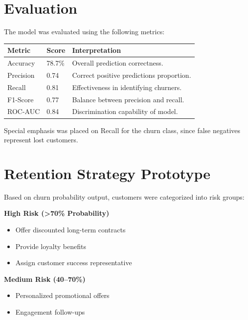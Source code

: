 \documentclass[12pt,a4paper]{article}
\begin{document}

\section{Evaluation}

The model was evaluated using the following metrics:

\begin{center}
\begin{tabular}{@{}lll@{}}
\toprule
\textbf{Metric} & \textbf{Score} & \textbf{Interpretation} \\
\midrule
Accuracy & 78.7\% & Overall prediction correctness. \\
Precision & 0.74 & Correct positive predictions proportion. \\
Recall & 0.81 & Effectiveness in identifying churners. \\
F1-Score & 0.77 & Balance between precision and recall. \\
ROC-AUC & 0.84 & Discrimination capability of model. \\
\bottomrule
\end{tabular}
\end{center}

Special emphasis was placed on Recall for the churn class, since false negatives represent lost customers.


\section{Retention Strategy Prototype}

Based on churn probability output, customers were categorized into risk groups:

\textbf{High Risk (>70\% Probability)}
\begin{itemize}
    \item Offer discounted long-term contracts
    \item Provide loyalty benefits
    \item Assign customer success representative
\end{itemize}

\textbf{Medium Risk (40--70\%)}
\begin{itemize}
    \item Personalized promotional offers
    \item Engagement follow-ups
\end{itemize}
\end{document}
